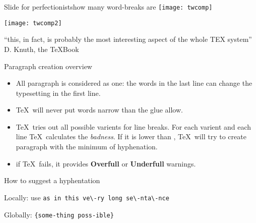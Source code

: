 
\begin{frame}{Slide for perfectionists}{how many word-breaks are}\relax
    \centering
    \texttt{[image: twcomp]}
    
    \texttt{[image: twcomp2]}
    
\end{frame}


\begin{frame}\relax
    \Huge\centering ``this, in fact, is probably the most interesting aspect of the whole TEX system''\\\hfill \large D. Knuth, the \TeX Book

\end{frame}

\begin{frame}{Paragraph creation overview\preMagicPage}\relax
    \begin{itemize}
        \item All paragraph is considered as one: the words in the last line can change the typesetting in the first line.
        \item \TeX\ will never put words narrow than the glue allow.
        \item \TeX\ tries out all possible varients for line breaks. For each varient and each line \TeX\ calculates the \textit{badness}. If it is lower than \ccol\tolerance, \TeX\ will try to create paragraph with the minimum of hyphenation.
        \item if \TeX\ fails, it provides \textbf{Overfull} or \textbf{Underfull} warnings.
    \end{itemize}
\end{frame}

\begin{frame}[fragile]{How to suggest a hyphentation\magicPage}\relax

    Locally: use \ccol\- \verb|as in this ve\-ry long se\-nta\-nce|
    
    Globally: \ccol\hyphenation\verb|{some-thing poss-ible}|
    
    \cprotect{}
\end{frame}

